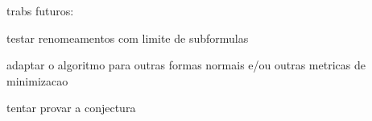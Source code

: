 
\label{cap_conclusoes}

trabs futuros:

testar renomeamentos com limite de subformulas

adaptar o algoritmo para outras formas normais e/ou outras metricas de minimizacao

tentar provar a conjectura
